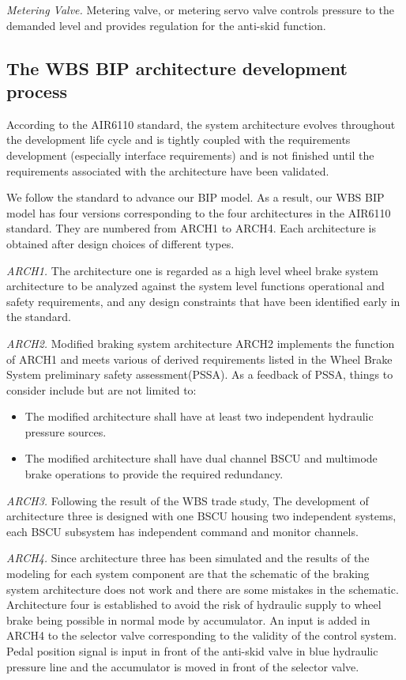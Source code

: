 \documentclass[conference]{IEEEtran}
\begin{document}
\emph{Metering Valve.} Metering valve, or metering servo valve controls pressure to the demanded level and provides regulation for the anti-skid function.

\subsection{The WBS BIP architecture development process}
According to the AIR6110 standard, the system architecture evolves throughout the development life cycle and is tightly coupled with the requirements development (especially interface requirements) and is not finished until the requirements associated with the architecture have been validated.

We follow the standard to advance our BIP model. As a result, our WBS BIP model has four versions corresponding to the four architectures in the AIR6110 standard. They are numbered from ARCH1 to ARCH4. Each architecture is obtained after design choices of different types.

\emph{ARCH1.} The architecture one is regarded as a high level wheel brake system architecture to be analyzed against the system level functions operational and safety requirements, and any design constraints that have been identified early in the standard.

\emph{ARCH2.} Modified braking system architecture ARCH2 implements the function of ARCH1 and meets various of derived requirements listed in the Wheel Brake System preliminary safety assessment(PSSA). As a feedback of PSSA, things to consider include but are not limited to:

\begin{itemize}
\item The modified architecture shall have at least two independent hydraulic pressure sources.
\item The modified architecture shall have dual channel BSCU and multimode brake operations to provide the required redundancy.
\end{itemize}

\emph{ARCH3.} Following the result of the WBS trade study, The development of architecture three is designed with one BSCU housing two independent systems, each BSCU subsystem has independent command and monitor channels.

\emph{ARCH4.} Since architecture three has been simulated and the results of the modeling for each system component are that the schematic of the braking system architecture does not work and there are some mistakes in the schematic. Architecture four is established to avoid the risk of hydraulic supply to wheel brake being possible in normal mode by accumulator. An input is added in ARCH4 to the selector valve corresponding to the validity of the control system. Pedal position signal is input in front of the anti-skid valve in blue hydraulic pressure line and the accumulator is moved in front of the selector valve.
\end{document}

